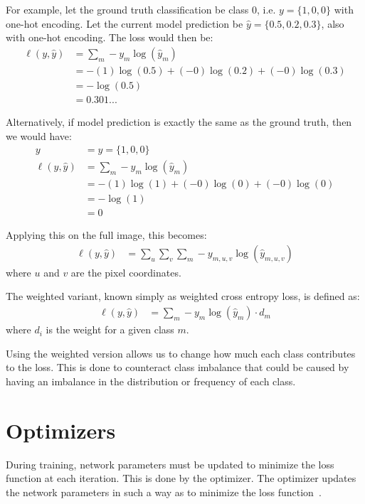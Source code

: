 For example, let the ground truth classification be class 0, i.e. $y = \{1, 0, 0\}$ with one-hot encoding.
Let the current model prediction be $\hat{y} = \{0.5, 0.2, 0.3\}$, also with one-hot encoding.
The loss would then be:
\begin{align}
	\ell(y, \hat{y}) 	&= \sum_{m}-y_m \log(\hat{y}_m) \\
						&= -(1)\log(0.5) + (-0)\log(0.2) + (-0)\log(0.3)\\
						&= -\log(0.5) \\
						&= 0.301...
\end{align}

Alternatively, if model prediction is exactly the same as the ground truth, then we would have:
\begin{align}
	y					&= \hat{y} = \{1, 0, 0\}\\
	\ell(y, \hat{y}) 	&= \sum_{m}-y_m \log(\hat{y}_m) \\
						&= -(1)\log(1) + (-0)\log(0) + (-0)\log(0)\\
						&= -\log(1) \\
						&= 0
\end{align}

Applying this on the full image, this becomes:
\begin{align}
	\ell(y, \hat{y}) &=\sum_u \sum_v \sum_{m}-y_{m, u, v}\log(\hat{y}_{m,u,v})
\end{align}
where $u$ and $v$ are the pixel coordinates.

The weighted variant, known simply as weighted cross entropy loss, is defined as:
\begin{align}
	\ell(y, \hat{y}) &=\sum_{m}-y_m\log(\hat{y}_m) \cdot d_m
\end{align}
where $d_i$ is the weight for a given class $m$.

Using the weighted version allows us to change how much each class contributes to the loss.
This is done to counteract class imbalance that could be caused by having an imbalance in the distribution or frequency of each class.

\section{Optimizers}\label{section:background-optimizers}
During training, network parameters must be updated to minimize the loss function at each iteration.
This is done by the optimizer.
The optimizer updates the network parameters in such a way as to minimize the loss function~\cite{optimizer-intro}.


